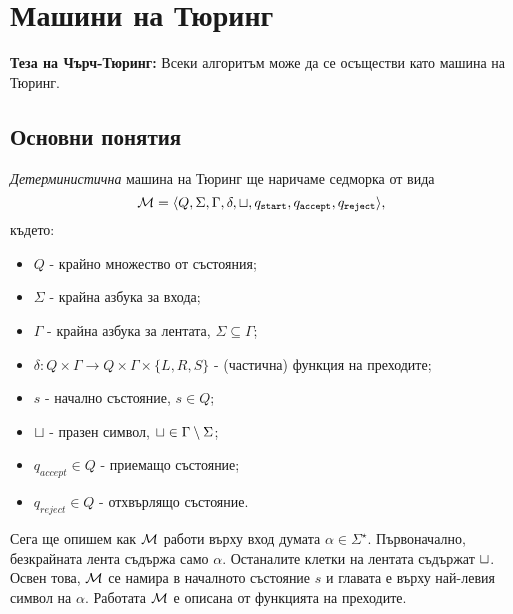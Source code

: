 \chapter{Машини на Тюринг}

\newcommand{\tape}[1]{\dots\blank\blank\blank{#1}\blank\blank\blank\dots}

\begin{framed}
  {\bf Теза на Чърч-Тюринг:} Всеки алгоритъм може да се осъществи като машина на Тюринг.
\end{framed}

\section{Основни понятия}

{\em Детерминистична} машина на Тюринг ще наричаме седморка от вида 
\[\mathcal{M} = \langle{Q,\Sigma,\Gamma,\delta,\sqcup,q_{\texttt{start}},q_{\texttt{accept}}, q_{\texttt{reject}}}\rangle,\] където:
\begin{itemize}
\item 
  $Q$ - крайно множество от състояния;
\item
  $\Sigma$ - крайна азбука за входа;
\item
  $\Gamma$ - крайна азбука за лентата, $\Sigma \subseteq \Gamma$;
\item
  $\delta:Q\times\Gamma \to Q\times \Gamma \times \{L,R,S\}$ - (частична) функция на преходите;
\item
  $s$ - начално състояние, $s \in Q$;
\item
  $\sqcup$ - празен символ,  $\sqcup \in \Gamma \setminus \Sigma$;
\item
  $q_{accept} \in Q$ - приемащо състояние;
\item
  $q_{reject} \in Q$ - отхвърлящо състояние.
\end{itemize}

Сега ще опишем как $\mathcal{M}$ работи върху вход думата $\alpha \in \Sigma^\star$.
Първоначално, безкрайната лента съдържа само $\alpha$. Останалите клетки на лентата съдържат $\sqcup$.
Освен това, $\mathcal{M}$ се намира в началното състояние $s$ и главата е върху най-левия символ на $\alpha$.
Работата $\mathcal{M}$ е описана от функцията на преходите.
  
